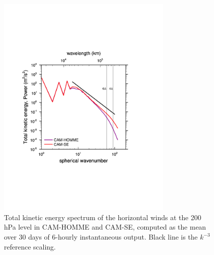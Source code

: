 \begin{figure}[h]
\centering
\includegraphics[width=20pc]{figs/kespectra.pdf}
\caption{Total kinetic energy spectrum of the horizontal winds at the 200 hPa level in CAM-HOMME and CAM-SE, computed as the mean over 30 days of 6-hourly instantaneous output. Black line is the $k^{-3}$ reference scaling.}
\label{fig:kespectra}
\end{figure}

